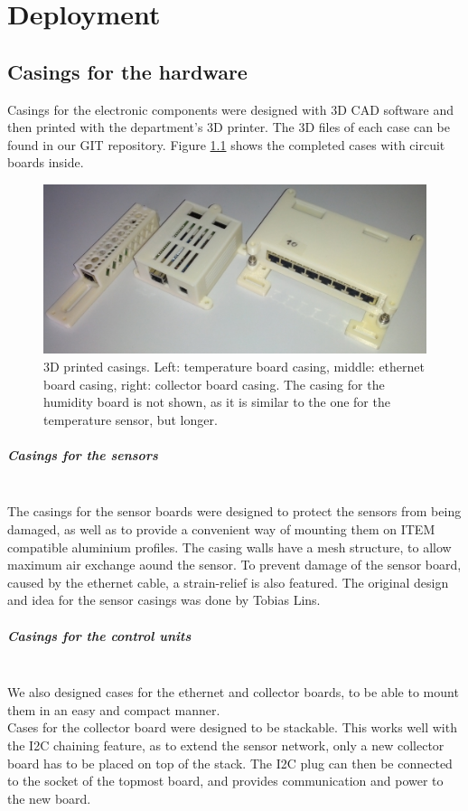 \documentclass[a4paper]{scrreprt}
\begin{document}
\chapter{Deployment}
\section{Casings for the hardware}
Casings for the electronic components were designed with 3D CAD software and then printed with the department's 3D printer. The 3D
files of each case can be found in our GIT repository. Figure \ref{fig:casings} shows the completed cases with circuit boards inside.
\begin{figure}[Hh!]
	\centering
	\includegraphics[width=\textwidth]{img/cases.jpg}
  \caption{3D printed casings. Left: temperature board casing, middle: ethernet board casing, right: collector board casing. The casing for the humidity board is not shown, as it is similar to the one for the temperature sensor, but longer.}
	\label{fig:casings}
\end{figure}
\paragraph{Casings for the sensors}\hspace{1cm}\\
The casings for the sensor boards were designed to protect the sensors from being damaged, as well as to provide a convenient way of
mounting them on ITEM compatible aluminium profiles. The casing walls have a mesh structure, to allow maximum air exchange aound the
sensor. To prevent damage of the sensor board, caused by the ethernet cable, a strain-relief is also featured. The original design and
idea for the sensor casings was done by Tobias Lins.
\paragraph{Casings for the control units}\hspace{1cm}\\
We also designed cases for the ethernet and collector boards, to be able to mount them in an easy and compact manner.\\
Cases for the collector board were designed to be stackable. This works well with the I2C chaining feature, as to extend the sensor network,
only a new collector board has to be placed on top of the stack. The I2C plug can then be connected to the socket of the topmost board, and provides
communication and power to the new board.
\end{document}
